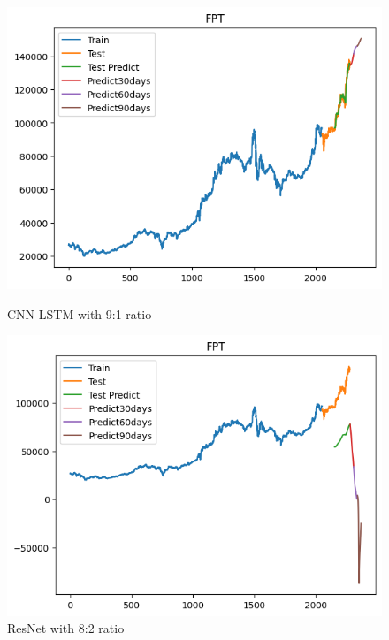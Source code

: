 \documentclass[conference]{IEEEtran}
\begin{document}
\begin{figure}[H]
    \centering
    \begin{minipage}{0.24\textwidth}
        \centering
        \includegraphics[width=\textwidth]{Figure/FPT/cnnlstm91.png}
        \caption{CNN-LSTM with 9:1 ratio}
        \label{fig:image1}
    \end{minipage}
    \hfill
    \begin{minipage}{0.24\textwidth}
        \centering
        \includegraphics[width=\textwidth]{Figure/FPT/resnet91.png}
        \caption{ResNet with 8:2 ratio}
        \label{fig:image2}
    \end{minipage}
\end{figure}
\end{document}
